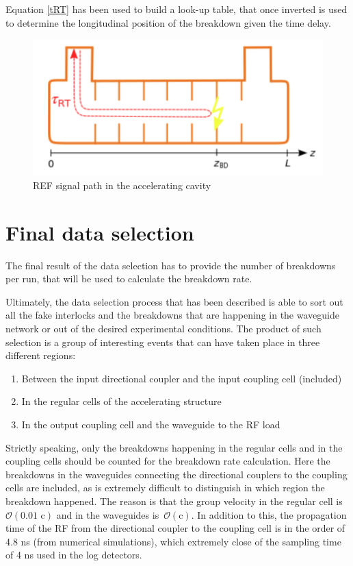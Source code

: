 Equation \ref{tRT} has been used to build a look-up table, that once inverted is used to determine the longitudinal position of the breakdown given the time delay.


\begin{figure}[h]
\centering 
\includegraphics[scale=0.3]{pictures/tToz}
\caption{REF signal path in the accelerating cavity}
\label{tToz_p}
\end{figure}




\section[Final data selection]{Final data selection}
\label{sec:BDR}

The final result of the data selection has to provide the number of breakdowns per run, that will be used to calculate the breakdown rate. 

Ultimately, the data selection process that has been described is able to sort out all the fake interlocks and the breakdowns that are happening in the waveguide network or out of the desired experimental conditions. The product of such selection is a group of interesting events that can have taken place in three different regions:
\begin{enumerate}
\item Between the input directional coupler and the input coupling cell (included)
\item In the regular cells of the accelerating structure
\item In the output coupling cell and the waveguide to the RF load
\end{enumerate}
Strictly speaking, only the breakdowns happening in the regular cells and in the coupling cells should be counted for the breakdown rate calculation. Here the breakdowns in the waveguides connecting the directional couplers to the coupling cells are included, as is extremely difficult to distinguish in which region the breakdown happened. The reason is that the group velocity in the regular cell is $\mathcal{O}(\text{0.01 c})$ and in the waveguides is~$\mathcal{O}(\text{c})$. In addition to this, the propagation time of the RF from the directional coupler to the coupling cell is in the order of 4.8 ns (from numerical simulations), which extremely close of the sampling time of 4 ns used in the log detectors. 

